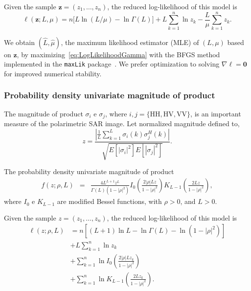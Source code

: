 \documentclass[journal]{IEEEtran}
\begin{document}
Given the sample $\bm z = (z_1,\dots,z_n)$,
the reduced log-likelihood of this model is
\begin{equation}
\ell(\bm z; L,\mu) = 
n \big[L\ln (L / \mu) - \ln \Gamma(L)\big]
+L \sum_{k=1}^{n}\ln z_k -\frac{L}{\mu}\sum_{k=1}^{n} z_k.
\label{eq:LogLikelihoodGamma}
\end{equation}

We obtain $(\widehat L, \widehat \mu)$, the maximum likelihood estimator (MLE) of $(L, \mu)$ based on $\bm z$, by maximizing~\eqref{eq:LogLikelihoodGamma} with the BFGS method implemented in the \texttt{maxLik} package~\cite{ht}.
We prefer optimization to solving $\nabla\ell=\bm 0$ for improved numerical stability.


\subsubsection{Probability density univariate magnitude of product}

The magnitude of product $\sigma_i$ e $\sigma_j$, where $i,j=\{\text{HH},\text{HV}, \text{VV}\}$, is an important measure of the polarimetric SAR image. Let normalized magnitude defined to, 
\begin{equation}
	z = \frac{\left|\frac{1}{L} \sum_{k=1}^L\sigma_i(k)\sigma_j^H(k) \right|}{\sqrt{E[|\sigma_i|^2]E[|\sigma_j|^2]}}.
\end{equation}

The probability density univariate magnitude of product
\begin{equation}\label{eq:pdf_mag_prod}
\begin{array}{lcl}
	f(z;\rho, L)&=&\frac{4L^{L+1} z^L}{\Gamma(L)(1-|\rho|^2)}I_0\left(\frac{2|\rho|L z}{1-|\rho|^2}\right)K_{L-1}\left(\frac{2L z}{1-|\rho|^2}\right),
		\end{array}
\end{equation}
where $I_0$ e $K_{L-1}$ are modified Bessel functions, with $\rho>0$, and $L>0$.

Given the sample $z = (z_1,\dots,z_n)$, the reduced log-likelihood of this model is
\begin{equation}\label{eq:eq_log_vero_mag_prod_red}
\begin{split}
    \ell(z;\rho, L)&=n\left[(L+1)\ln L-\ln\Gamma(L)-\ln(1-|\rho|^2)\right]\\
                         &+L\sum_{k=1}^{n} \ln z_k\\
                         &+\sum_{k=1}^{n}\ln I_0\left(\frac{2|\rho|L z_k}{1-|\rho|^2}\right)\\
                         &+ \sum_{k=1}^{n}\ln K_{L-1}\left(\frac{2L z_k}{1-|\rho|^2}\right).\\
\end{split}
 \end{equation} 
%
\end{document}
